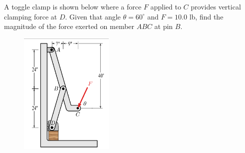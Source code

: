 
\noindent A toggle clamp is shown below where a force $F$ applied to $C$ provides vertical clamping force at $D$.  Given that angle $\theta = 60^\circ$ and $F = 10.0$ lb, find the magnitude of the force exerted on member $ABC$ at pin $B$.

\begin{figure}[ht!]
  \centering
  \includegraphics[width=0.4\textwidth,height=0.5\textheight,keepaspectratio]{fig.png}
\end{figure}


